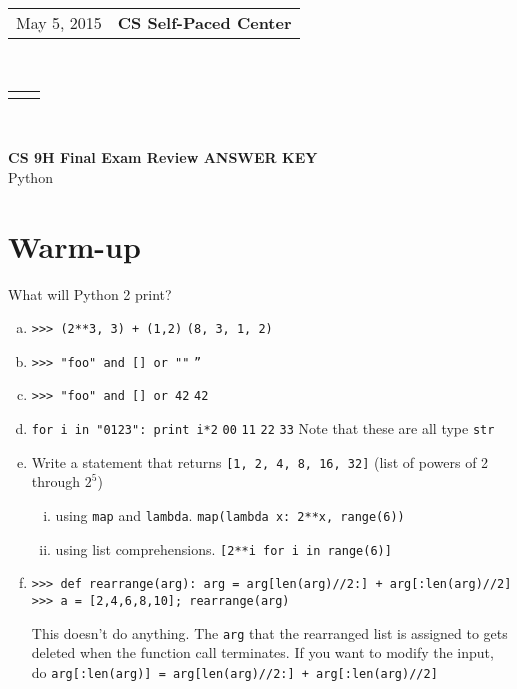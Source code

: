 \documentclass[11pt]{article}
\renewcommand{\title}[1]{\large\textbf{#1}\\}
\renewcommand{\line}{\begin{tabularx}{\textwidth}{X>{\raggedleft}X}\hline\\\end{tabularx}\\[-0.5cm]}
\newcommand{\leftright}[2]{\begin{tabularx}{\textwidth}{X>{\raggedleft}X}#1%
& #2\\\end{tabularx}\\[-0.5cm]}
\begin{document}
\leftright{May 5, 2015}{\textbf{CS Self-Paced Center}} %
\line

\begin{center}
    \Large\textbf{CS 9H Final Exam Review ANSWER KEY}\\
    \large{Python}
 \end{center}



\section{Warm-up}
What will Python 2 print?
\begin{enumerate}[a)]
\item \texttt{>>> (2**3, 3) + (1,2)}
\newline \texttt{(8, 3, 1, 2)}
\vspace{1cm}

\item \texttt{>>> "foo" and [] or ""}
\newline \texttt{''}
\vspace{1cm}

\item \texttt{>>> "foo" and [] or 42}
\newline \texttt{42}
\vspace{1cm}

\item \texttt{for i in "0123": print i*2}
\newline \texttt{00}
\newline \texttt{11}
\newline \texttt{22}
\newline \texttt{33}
\newline *Note that these are all type \texttt{str}
\vspace{1cm}

\item Write a statement that returns \texttt{[1, 2, 4, 8, 16, 32]} (list of powers of 2 through $2^{5}$)
    \begin{enumerate}[i)]
    \item using \texttt{map} and \texttt{lambda}.
    \newline \texttt{map(lambda x: 2**x, range(6))}
    \vspace{1cm}
    \item using list comprehensions.
    \newline \texttt{[2**i for i in range(6)]}
    \vspace{1cm}
    \end{enumerate}
\item \begin{verbatim}
>>> def rearrange(arg): arg = arg[len(arg)//2:] + arg[:len(arg)//2]
>>> a = [2,4,6,8,10]; rearrange(arg)
\end{verbatim}
This doesn't do anything. The \texttt{arg} that the rearranged list is assigned to gets deleted when the function call terminates. If you want to modify the input, do \texttt{arg[:len(arg)] = arg[len(arg)//2:] + arg[:len(arg)//2]}
\end{enumerate}
\end{document}
